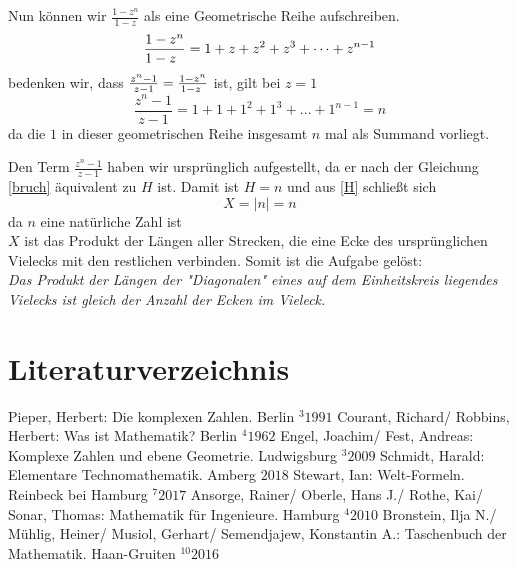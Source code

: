 \documentclass[a4paper,12pt]{article} %
\begin{document}
Nun können wir $\frac{1-z^n}{1-z}$ als eine Geometrische Reihe aufschreiben.
\[\frac{1-z^n}{1-z\hspace{2mm}}=1+z+z^2+z^3+\dots+z^{n-1}\]
bedenken wir, dass $\frac{z^n-1}{z-1}=\frac{1-z^n}{1-z\hspace{1mm}}$ ist, gilt bei $z=1$
\[\frac{z^n-1}{z-1}=1+1+1^2+1^3+\dots+1^{n-1}=n\]
da die $1$ in dieser geometrischen Reihe insgesamt $n$ mal als Summand vorliegt.


Den Term $\frac{z^n-1}{z-1}$ haben wir ursprünglich aufgestellt, da er nach der Gleichung \eqref{bruch} äquivalent zu $H$ ist. Damit ist $H=n$ und aus \eqref{H} schließt sich
\[X=|n|=n\]
da $n$ eine natürliche Zahl ist\\

$X$ ist das Produkt der Längen aller Strecken, die eine Ecke des ursprünglichen Vielecks mit den restlichen verbinden. Somit ist die Aufgabe gelöst:\\

\noindent\emph{Das Produkt der Längen der "Diagonalen" {} eines auf dem Einheitskreis liegendes Vielecks ist gleich der Anzahl der Ecken im Vieleck.}






\newpage
\section{Literaturverzeichnis}




\renewcommand{\refname}{Printquellen}  %
\small
\begin{thebibliography}{9}
	 Pieper, Herbert: Die komplexen Zahlen. Berlin $^3 1991$
	 Courant, Richard/ Robbins, Herbert: Was ist Mathematik? Berlin $^4 1962$
	 Engel, Joachim/ Fest, Andreas: Komplexe Zahlen und ebene Geometrie. Ludwigsburg $^3 2009$
	 Schmidt, Harald: Elementare Technomathematik. Amberg $2018$
	 Stewart, Ian: Welt-Formeln. Reinbeck bei Hamburg  $^7 2017$
	 Ansorge, Rainer/ Oberle, Hans J./ Rothe, Kai/ Sonar, Thomas: Mathematik für Ingenieure. Hamburg $^4 2010$
	 Bronstein, Ilja N./ Mühlig, Heiner/ Musiol, Gerhart/ Semendjajew, Konstantin A.: Taschenbuch der Mathematik. Haan-Gruiten $^{10} 2016$
\end{thebibliography}
\end{document}
